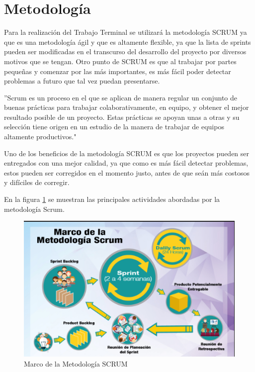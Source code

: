 \section{Metodología}
Para la realización del Trabajo Terminal se utilizará la metodología SCRUM ya que es una metodología ágil y que es altamente flexible, ya que la lista de sprints pueden ser modificadas en el transcurso del desarrollo del proyecto por diversos motivos que se tengan. Otro punto de SCRUM es que al trabajar por partes pequeñas y comenzar por las más importantes, es más fácil poder detectar problemas a futuro que tal vez puedan presentarse\cite{Referencia17}.

''Scrum es un proceso en el que se aplican de manera regular un conjunto de buenas prácticas para trabajar colaborativamente, en equipo, y obtener el mejor resultado posible de un proyecto. Estas prácticas se apoyan unas a otras y su selección tiene origen en un estudio de la manera de trabajar de equipos altamente productivos."\cite{Referencia18}

Uno de los beneficios de la metodología SCRUM es que los proyectos pueden ser entregados con una mejor calidad, ya que como es más fácil detectar problemas, estos pueden ser corregidos en el momento justo, antes de que seán más costosos y difíciles de corregir. 

En la figura \ref{fig:metodologiaSCRUM} se muestran las principales actividades abordadas por la metodología Scrum.
\newpage
\begin{figure}[htb]
	\centering
	\includegraphics[width=1\textwidth]{images/introduccion/scrum}
	\caption{Marco de la Metodología SCRUM} \label{fig:metodologiaSCRUM}
\end{figure}

